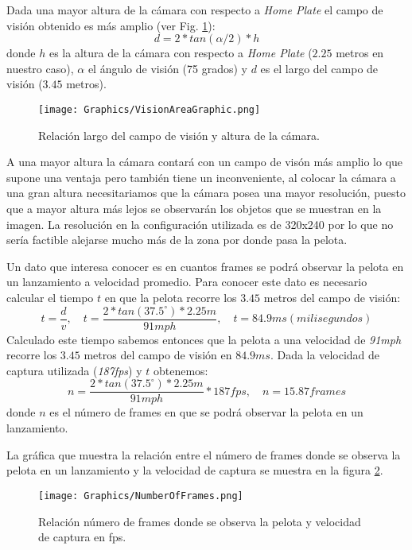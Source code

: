 Dada una mayor altura de la cámara con respecto a \textit{Home Plate} el campo de visión obtenido es más amplio (ver Fig. \ref{fig:VisionAreaGraphic}):
$$d=2*tan(\alpha/2)*h$$
donde $h$ es la altura de la cámara con respecto a \textit{Home Plate} ($2.25$ metros en nuestro caso), $\alpha$ el ángulo de visión (75 grados) y $d$ es el largo del campo de visión ($3.45$ metros).

\begin{figure}[!h]
        \centering
        \texttt{[image: Graphics/VisionAreaGraphic.png]}
        \caption{Relación largo del campo de visión y altura de la cámara.}
        \label{fig:VisionAreaGraphic}
\end{figure}

A una mayor altura la cámara contará con un campo de visón más amplio lo que supone una ventaja pero también tiene un inconveniente, al colocar la cámara a una gran altura necesitariamos que la cámara posea una mayor resolución, puesto que a mayor altura más lejos se observarán los objetos que se muestran en la imagen. La resolución en la configuración utilizada es de 320x240 por lo que no sería factible alejarse mucho más de la zona por donde pasa la pelota.

Un dato que interesa conocer es en cuantos frames se podrá observar la pelota en un lanzamiento a velocidad promedio. Para conocer este dato es necesario calcular el tiempo $t$ en que la pelota recorre los $3.45$ metros del campo de visión:
$$t = \frac{d}{v}, \quad t = \frac{2*tan(37.5^{\circ})*2.25m}{91mph}, \quad t = 84.9ms (milisegundos)$$
Calculado este tiempo sabemos entonces que la pelota a una velocidad de \textit{91mph} recorre los $3.45$ metros del campo de visión en $84.9ms$. Dada la velocidad de captura utilizada (\textit{187fps}) y $t$ obtenemos:
$$n=\frac{2*tan(37.5^{\circ})*2.25m}{91mph}*187fps, \quad n=15.87 frames$$
donde $n$ es el número de frames en que se podrá observar la pelota en un lanzamiento.

La gráfica que muestra la relación entre el número de frames donde se observa la pelota en un lanzamiento y la velocidad de captura se muestra en la figura \ref{fig:NumberOfFrames}.

\begin{figure}[!h]
    \centering
    \texttt{[image: Graphics/NumberOfFrames.png]}
    \caption{Relación número de frames donde se observa la pelota y velocidad de captura en fps.}
    \label{fig:NumberOfFrames}
\end{figure}

